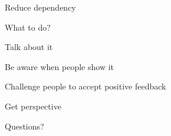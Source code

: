 \documentclass[aspectratio=169]{beamer}
\begin{document}
\begin{frame}
  \begin{center}
    \Huge Reduce dependency
    \\ \small \cite{langford93}
  \end{center}
\end{frame}

\begin{frame}
  \begin{center}
    \Huge What to do?
    \small
  \end{center}
\end{frame}

\begin{frame}
  \begin{center}
    \Huge Talk about it
    \small
  \end{center}
\end{frame}

\begin{frame}
  \begin{center}
    \Huge Be aware when people show it
    \small
  \end{center}
\end{frame}

\begin{frame}
  \begin{center}
    \Huge Challenge people to accept positive feedback
  \end{center}
\end{frame}

\begin{frame}
  \begin{center}
    \Huge Get perspective
    \small
  \end{center}
\end{frame}

\begin{frame}
  \begin{center}
    \Huge Questions?
  \end{center}
\end{frame}

\begin{frame}
 

  
\end{frame}
\end{document}
